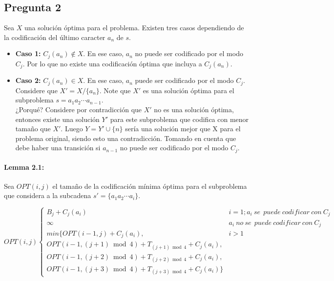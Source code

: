 \newpage

\subsection{Pregunta 2}

Sea $X$ una solución óptima para el problema. Existen tres casos dependiendo de la codificación 
del último caracter $a_n$ de $s$.

\begin{itemize}
    \item \textbf{Caso 1:} $C_j(a_n) \not\in X$. 
    En ese caso, $a_n$ no puede ser codificado por el modo $C_j$. Por lo que no existe una 
    codificación óptima que incluya a $C_j(a_n)$.  
    \item \textbf{Caso 2:} $C_j(a_n) \in X$.
    En ese caso, $a_n$ puede ser codificado por el modo $C_j$. Considere que $X' = X / \{a_n\}$.
    Note que $X'$ es una solución óptima para el subproblema $s={a_1a_2\cdots a_{n-1}}$. 
    \\¿Porqué? Considere por contradicción que $X'$ no es una solución óptima, entonces existe una 
    solución $Y'$ para este subproblema que codifica con menor tamaño que $X'$. Luego 
    $Y = Y' \cup \{n\}$ sería una solución mejor que X para el problema original, siendo esto
    una contradicción. Tomando en cuenta que debe haber una transición si $a_{n-1}$ no puede ser 
    codificado por el modo $C_j$.
\end{itemize}

\paragraph{Lemma 2.1:}
Sea $OPT(i, j)$ el tamaño de la codificación mínima óptima para el subproblema que considera a 
la subcadena $s'=\{a_1a_2 \cdots a_{i}\}$.

\[ OPT(i, j) \begin{cases} 
    B_j + C_j(a_i) & i = 1; a_i \: se\: \: puede\: codificar\: con\: C_j \\
    \infty & a_i \: no \: se\: \: puede\: codificar\: con\: C_j \\
    min\{OPT(i - 1, j) + C_j(a_i), & i > 1\\
    OPT(i - 1, (j+1) \bmod{4}) + T_{(j+1) \bmod{4}} + C_j(a_i), \\
    OPT(i - 1, (j+2) \bmod{4}) + T_{(j+2) \bmod{4}} +C_j(a_i), \\ 
    OPT(i - 1, (j+3) \bmod{4}) + T_{(j+3) \bmod{4}} + C_j(a_i)\}
 \end{cases}
\]

